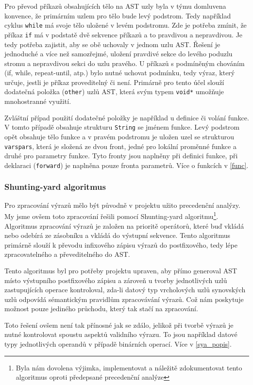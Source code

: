 \documentclass[12pt,a4paper,titlepage,final]{article}
\begin{document}
Pro převod příkazů obsahujících tělo na AST uzly byla v týmu domluvena konvence,
že primárním uzlem pro tělo bude levý podstrom. Tedy například cyklus \verb|while|
má svoje tělo uložené v levém podstromu. Zde je potřeba zmínit, že příkaz \verb|if|
má v podstatě dvě sekvence příkazů a to pravdivou a nepravdivou. Je tedy potřeba
zajistit, aby se obě uchovaly v jednom uzlu AST. Řešení je jednoduché a více než samozřejmé, uložení pravdivé sekce do levého
poduzlu stromu a nepravdivou sekci do uzlu pravého. U příkazů s podmíněným
chováním (if, while, repeat-until, atp.) bylo nutné uchovat podmínku, tedy výraz,
který určuje, jestli je příkaz proveditelný či není. Primárně pro tento účel
slouží dodatečná položka (\verb|other|) uzlů AST, která svým typem \verb|void*| umožňuje
mnohostranné využití. 

Zvláštní případ použití dodatečné položky je například u definice či volání funkce.
V tomto případě obsahuje strukturu \verb|String| se jménem funkce. Levý podstrom
opět obsahuje tělo funkce a v pravém podstromu je uložen uzel se strukturou \verb|varspars|,
která je složená ze dvou front, jedné pro lokální proměnné funkce a druhé pro
parametry funkce. Tyto fronty jsou naplněny při definici funkce, při deklaraci
(\verb|forward|) je naplněna pouze fronta parametrů. Více o funkcích v \ref{func}.

\subsubsection{Shunting-yard algoritmus} \label{sya}
Pro zpracování výrazů mělo být původně v projektu užito precedenční analýzy. My jsme ovšem toto zpracování řešili pomocí Shunting-yard algoritmu\footnote{Byla nám
dovolena výjimka, implementovat a náležitě zdokumentovat tento algoritmus oproti předepsané
precedenční analýze}. Algoritmus zpracování výrazů je založen na prioritě operátorů, které buď vkládá
nebo odebírá ze zásobníku a vkládá do výstupní sekvence. Tento algoritmus primárně
slouží k převodu infixového zápisu výrazů do postfixového, tedy lépe zpracovatelného
a převeditelného do AST.

Tento algoritmus byl pro potřeby projektu upraven, aby přímo generoval AST místo
výstupního postfixového zápisu a zároveň u tvorby jednotlivých uzlů zastupujících
operace kontroloval, zda-li datový typ vrcholových uzlů synovských uzlů odpovídá
sémantickým pravidlům zpracovávání výrazů. Což nám poskytuje možnost pouze jediného průchodu, který tak stačí na zpracování.

Toto řešení ovšem není tak přínosné jak se zdálo, jelikož při tvorbě výrazů je nutné kontrolovat spoustu aspektů validního výrazu. To jsou
například datové typy jednotlivých operandů v případě binárních operací. Více v  \ref{sya_popis}.
\end{document}
